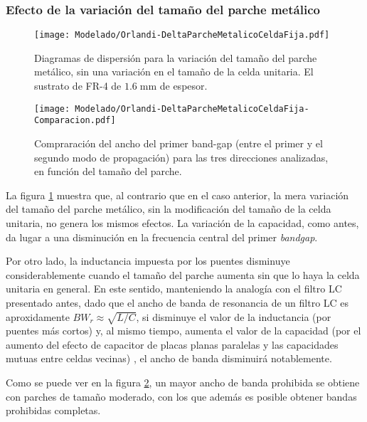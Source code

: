 \clearpage

\subsubsection{Efecto de la variación del tamaño del parche metálico}

\begin{figure}[h]
	\centering
	\texttt{[image: Modelado/Orlandi-DeltaParcheMetalicoCeldaFija.pdf]}
	\caption{Diagramas de dispersión para la variación del tamaño del parche metálico, sin una variación en el tamaño de la celda unitaria. El sustrato de FR-4 de $1.6\;\text{mm}$ de espesor.}
	\label{fig:diagdisp-orlandi-variacion-tam-parche}
\end{figure}


\begin{figure}[h]
	\centering
	\texttt{[image: Modelado/Orlandi-DeltaParcheMetalicoCeldaFija-Comparacion.pdf]}
	\caption{Compraración del ancho del primer band-gap (entre el primer y el segundo modo de propagación) para las tres direcciones analizadas, en función del tamaño del parche.}
	\label{fig:comparacion-diagdisp-orlandi-variacion-tam-parche}
\end{figure}

La figura \ref{fig:diagdisp-orlandi-variacion-tam-parche} muestra que, al contrario que en el caso anterior, la mera variación del tamaño del parche metálico, sin la modificación del tamaño de la celda unitaria, no genera los mismos efectos. La variación de la capacidad, como antes, da lugar a una disminución en la frecuencia central del primer \textit{bandgap}.

Por otro lado, la inductancia impuesta por los puentes disminuye considerablemente cuando el tamaño del parche aumenta sin que lo haya la celda unitaria en general. En este sentido, manteniendo la analogía con el filtro LC presentado antes, dado que el ancho de banda de resonancia de un filtro LC es aproxidamente $BW_r \approx \sqrt{L/C}$, si disminuye el valor de la inductancia (por puentes más cortos) y, al mismo tiempo, aumenta el valor de la capacidad (por el aumento del efecto de capacitor de placas planas paralelas y las capacidades mutuas entre celdas vecinas) , el ancho de banda disminuirá notablemente.

Como se puede ver en la figura \ref{fig:comparacion-diagdisp-orlandi-variacion-tam-parche}, un mayor ancho de banda prohibida se obtiene con parches de tamaño moderado, con los que además es posible obtener bandas prohibidas completas.


